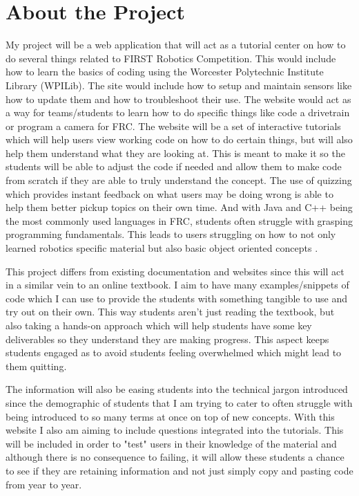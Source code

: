 \documentclass[10pt,twocolumn]{article}
\begin{document}
\section{About the Project}

My project will be a web application that will act as a tutorial center on how to do several things related to FIRST Robotics Competition. This would include how to learn the basics of coding using the Worcester Polytechnic Institute Library (WPILib). The site would include how to setup and maintain sensors like how to update them and how to troubleshoot their use. The website would act as a way for teams/students to learn how to do specific things like code a drivetrain or program a camera for FRC. The website will be a set of interactive tutorials which will help users view working code on how to do certain things, but will also help them understand what they are looking at. This is meant to make it so the students will be able to adjust the code if needed and allow them to make code from scratch if they are able to truly understand the concept. The use of quizzing which provides instant feedback on what users may be doing wrong is able to help them better pickup topics on their own time\cite{IntroProgrammingInteractive}. And with Java and C++ being the most commonly used languages in FRC, students often struggle with grasping programming fundamentals. This leads to users struggling on how to not only learned robotics specific material but also basic object oriented concepts \cite{ImplementingInteractiveTutorials}.

This project differs from existing documentation and websites since this will act in a similar vein to an online textbook. I aim to have many examples/snippets of code which I can use to provide the students with something tangible to use and try out on their own. This way students aren't just reading the textbook, but also taking a hands-on approach which will help students have some key deliverables so they understand they are making progress. This aspect keeps students engaged as to avoid students feeling overwhelmed which might lead to them quitting.

The information will also be easing students into the technical jargon introduced since the demographic of students that I am trying to cater to often struggle with being introduced to so many terms at once on top of new concepts.  With this website I also am aiming to include questions integrated into the tutorials. This will be included in order to "test" users in their knowledge of the material and although there is no consequence to failing, it will allow these students a chance to see if they are retaining information and not just simply copy and pasting code from year to year. 
\end{document}
